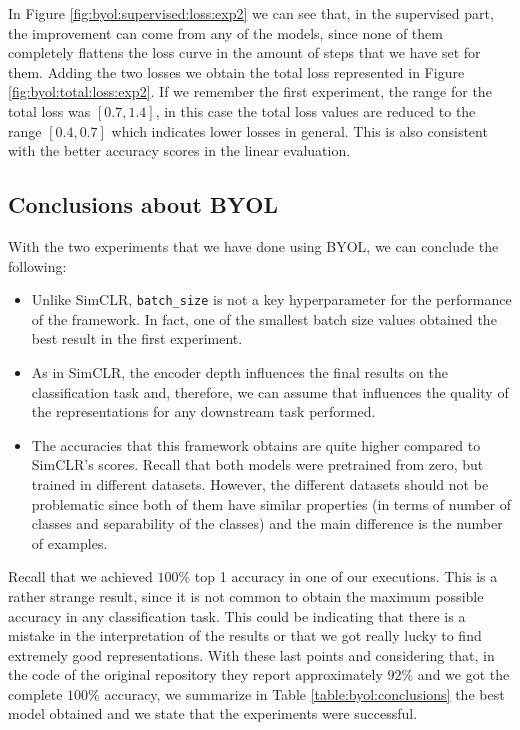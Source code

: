 In Figure \ref{fig:byol:supervised:loss:exp2} we can see that, in the supervised part, the improvement can come from any of the models, since none of them completely flattens the loss curve in the amount of steps that we have set for them. Adding the two losses we obtain the total loss represented in Figure \ref{fig:byol:total:loss:exp2}. If we remember the first experiment, the range for the total loss was $[0.7,1.4]$, in this case the total loss values are reduced to the range $[0.4,0.7]$ which indicates lower losses in general. This is also consistent with the better accuracy scores in the linear evaluation.


\subsection{Conclusions about BYOL}

With the two experiments that we have done using BYOL, we can conclude the following:
\begin{itemize}
\item Unlike SimCLR, \lstinline{batch_size} is not a key hyperparameter for the performance of the framework. In fact, one of the smallest batch size values obtained the best result in the first experiment.

\item As in SimCLR, the encoder depth influences the final results on the classification task and, therefore, we can assume that influences the quality of the representations for any downstream task performed.


\item The accuracies that this framework obtains are quite higher compared to SimCLR's scores. Recall that both models were pretrained from zero, but trained in different datasets. However, the different datasets should not be problematic since both of them have similar properties (in terms of number of classes and separability of the classes) and the main difference is the number of examples.


\end{itemize}

Recall that we achieved $100\%$ top 1 accuracy in one of our executions. This is a rather strange result, since it is not common to obtain the maximum possible accuracy in any classification task. This could be indicating that there is a mistake in the interpretation of the results or that we got really lucky to find extremely good representations.
With these last points and considering that, in the code of the original repository they report approximately $92\%$ and we got the complete $100\%$ accuracy, we summarize in Table \ref{table:byol:conclusions} the best model obtained and we state that the experiments were successful.

